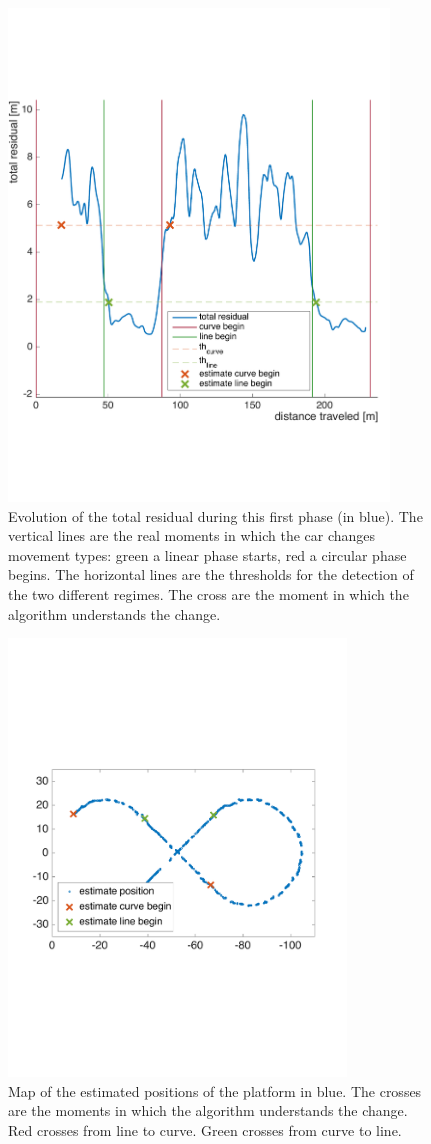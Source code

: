 \begin{figure}[!htbp]
    \centering
    \includegraphics[width=0.9\textwidth, height=0.5\textwidth]{img/following_platform_for_long_position_base_error.pdf}
    \caption{Evolution of the total residual during this first phase (in blue). The vertical lines are the real moments in which the car changes movement types: green a linear phase starts, red a circular phase begins. The horizontal lines are the thresholds for the detection of the two different regimes. The cross are the moment in which the algorithm understands the change.}
    \label{fig:error_regression}
\end{figure}

\begin{figure}[!htbp]
    \centering
    \includegraphics[width=0.8\textwidth]{img/following_platform_for_long_map_simple.pdf}
    \caption{Map of the estimated positions of the platform in blue. The crosses are the moments in which the algorithm understands the change. Red crosses from line to curve. Green crosses from curve to line.}
    \label{fig:error_regression_map}
\end{figure}

